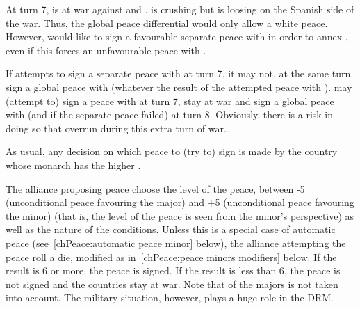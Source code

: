 \begin{exemple}
  At turn 7, \FRA is at war against \HIS and \paysSavoie. \FRA is crushing
  \paysSavoie but is loosing on the Spanish side of the war. Thus, the global
  peace differential would only allow a white peace. However, \FRA would like
  to sign a favourable separate peace with \paysSavoie in order to annex
  \provinceBresse, even if this forces an unfavourable peace with \HIS.

  If \FRA attempts to sign a separate peace with \paysSavoie at turn 7, it may
  not, at the same turn, sign a global peace with \HIS (whatever the result of
  the attempted peace with \HIS). \FRA may (attempt to) sign a peace with
  \paysSavoie at turn 7, stay at war and sign a global peace with \HIS (and
  \paysSavoie if the separate peace failed) at turn 8. Obviously, there is a
  risk in doing so that \HIS overrun \FRA during this extra turn of war\ldots
\end{exemple}

\aparag[Disagreement] As usual, any decision on which peace to (try to) sign
is made by the country whose monarch has the higher \DIP.

\aparag[Method]
\bparag The alliance proposing peace choose the level of the peace, between -5
(unconditional peace favouring the major) and +5 (unconditional peace
favouring the minor) (that is, the level of the peace is seen from the minor's
perspective) as well as the nature of the conditions.
\bparag Unless this is a special case of automatic peace
(see~\ref{chPeace:automatic peace minor} below), the alliance attempting the
peace roll a die, modified as in~\ref{chPeace:peace minors modifiers} below.
\bparag If the result is 6 or more, the peace is signed.
\bparag If the result is less than 6, the peace is not signed and the
countries stay at war.
\bparag Note that \STAB of the majors is not taken into account. The military
situation, however, plays a huge role in the DRM.


